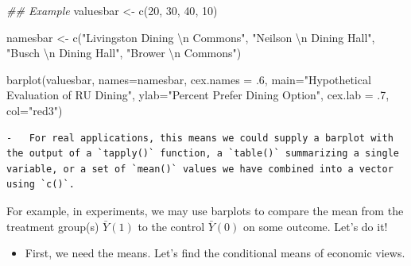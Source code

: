 \documentclass[
  letterpaper,
  DIV=11,
  numbers=noendperiod]{scrreprt}
\newenvironment{Shaded}{\begin{snugshade}}{\end{snugshade}}
\newcommand{\AttributeTok}[1]{\textcolor[rgb]{0.40,0.45,0.13}{#1}}
\newcommand{\CommentTok}[1]{\textcolor[rgb]{0.37,0.37,0.37}{#1}}
\newcommand{\DecValTok}[1]{\textcolor[rgb]{0.68,0.00,0.00}{#1}}
\newcommand{\DocumentationTok}[1]{\textcolor[rgb]{0.37,0.37,0.37}{\textit{#1}}}
\newcommand{\FunctionTok}[1]{\textcolor[rgb]{0.28,0.35,0.67}{#1}}
\newcommand{\NormalTok}[1]{\textcolor[rgb]{0.00,0.23,0.31}{#1}}
\newcommand{\OtherTok}[1]{\textcolor[rgb]{0.00,0.23,0.31}{#1}}
\newcommand{\SpecialCharTok}[1]{\textcolor[rgb]{0.37,0.37,0.37}{#1}}
\newcommand{\StringTok}[1]{\textcolor[rgb]{0.13,0.47,0.30}{#1}}
\providecommand{\tightlist}{%
  \setlength{\itemsep}{0pt}\setlength{\parskip}{0pt}}\usepackage{longtable,booktabs,array}
\begin{document}
\begin{Shaded}
\begin{Highlighting}[]
\DocumentationTok{\#\# Example}
\NormalTok{valuesbar }\OtherTok{\textless{}{-}} \FunctionTok{c}\NormalTok{(}\DecValTok{20}\NormalTok{, }\DecValTok{30}\NormalTok{, }\DecValTok{40}\NormalTok{, }\DecValTok{10}\NormalTok{)}

\NormalTok{namesbar }\OtherTok{\textless{}{-}} \FunctionTok{c}\NormalTok{(}\StringTok{"Livingston Dining }\SpecialCharTok{\textbackslash{}n}\StringTok{ Commons"}\NormalTok{,}
              \StringTok{"Neilson }\SpecialCharTok{\textbackslash{}n}\StringTok{ Dining Hall"}\NormalTok{,}
              \StringTok{"Busch }\SpecialCharTok{\textbackslash{}n}\StringTok{ Dining Hall"}\NormalTok{,}
              \StringTok{"Brower }\SpecialCharTok{\textbackslash{}n}\StringTok{ Commons"}\NormalTok{)}

\FunctionTok{barplot}\NormalTok{(valuesbar,}
        \AttributeTok{names=}\NormalTok{namesbar,}
        \AttributeTok{cex.names =}\NormalTok{ .}\DecValTok{6}\NormalTok{,}
        \AttributeTok{main=}\StringTok{"Hypothetical Evaluation of RU Dining"}\NormalTok{,}
        \AttributeTok{ylab=}\StringTok{"Percent Prefer Dining Option"}\NormalTok{,}
        \AttributeTok{cex.lab =}\NormalTok{ .}\DecValTok{7}\NormalTok{, }
        \AttributeTok{col=}\StringTok{"red3"}\NormalTok{)}
\end{Highlighting}
\end{Shaded}

\begin{verbatim}
-   For real applications, this means we could supply a barplot with the output of a `tapply()` function, a `table()` summarizing a single variable, or a set of `mean()` values we have combined into a vector using `c()`.
\end{verbatim}

For example, in experiments, we may use barplots to compare the mean
from the treatment group(s) \(\bar{Y}(1)\) to the control \(\bar{Y}(0)\)
on some outcome. Let's do it!

\begin{itemize}
\tightlist
\item
  First, we need the means. Let's find the conditional means of economic
  views.
\end{itemize}

\begin{Shaded}
\end{Shaded}
\end{document}
